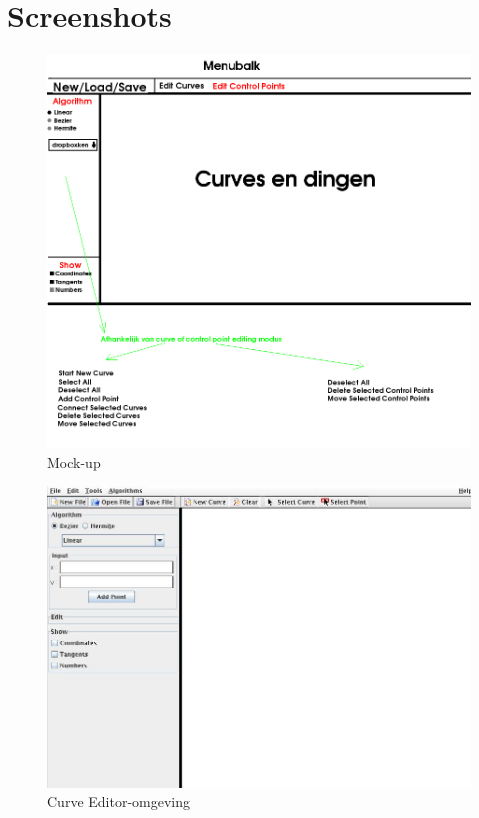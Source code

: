 \documentclass[a4paper,11pt,oneside, titlepage]{article}
\begin{document}
\section{Screenshots}
\begin{figure}[htbp]
\centering
\includegraphics[scale=0.4]{./mockup.png}
\caption{Mock-up}
\end{figure}
\begin{figure}[htbp]
\centering
\includegraphics[scale=0.4]{./screenies/start.jpg}
\caption{Curve Editor-omgeving}
\end{figure}
\end{document}
